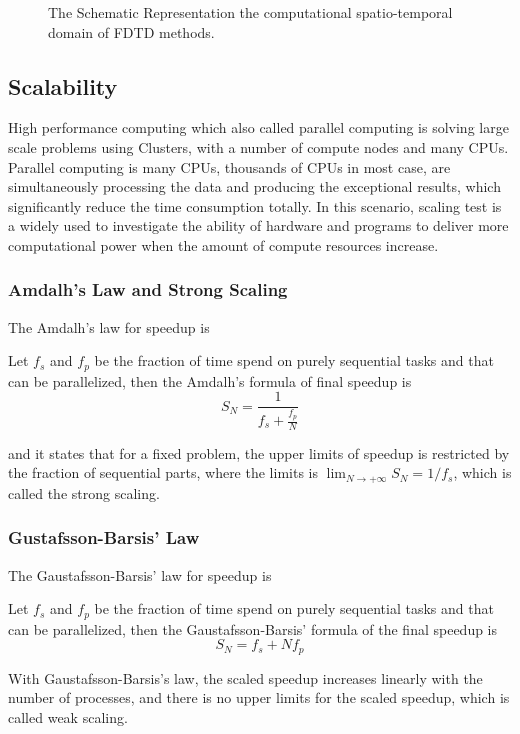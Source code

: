 \begin{figure}[htbp]
  \caption{The Schematic Representation the computational spatio-temporal domain of FDTD methods.}
  \label{FIG:Scheme_FDTD_2D_Heat}
\end{figure}



\subsection{Scalability}
High performance computing which also called 
parallel computing
is solving large scale problems using Clusters, with a number of compute nodes and many CPUs.
Parallel computing is many CPUs, thousands of CPUs in most case, are simultaneously processing the data and 
producing the exceptional results, which significantly reduce the time consumption totally.
In this scenario, scaling test is a widely used to investigate the ability of hardware and programs to 
deliver more computational power when the amount of compute resources increase.

\subsubsection{Amdalh's Law and Strong Scaling}
The Amdalh's law for speedup is 
\begin{theorem}\label{THEO:Amdalh's law}
  Let $f_s$ and $f_p$ be the fraction of time spend on purely sequential tasks and that can be parallelized, then 
  the Amdalh's formula
  \cite{Amdalh'sLaw} of final speedup is
  \begin{equation}\label{EQ:Amdalh's law}
    S_N = \frac{1}{f_s + \frac{f_p}{N}}
  \end{equation}
\end{theorem}
and it states that for a fixed problem, the upper limits of speedup is restricted by the fraction of sequential parts, 
where the limits is $\lim_{N\to +\infty} S_N = 1 / f_s$, which is called the strong scaling.


\subsubsection{Gustafsson-Barsis' Law}
The Gaustafsson-Barsis' law for speedup is 
\begin{theorem}\label{THEO:GaustafssonLaw}
  Let $f_s$ and $f_p$ be the fraction of time spend on purely sequential tasks and that can be parallelized, then 
  the Gaustafsson-Barsis' formula 
                                                        \cite{GaustafssonLaw}
  of the final speedup is 
  \begin{equation}\label{EQ:GaustafssonLaw}
    S_N = f_s + Nf_p
  \end{equation}
\end{theorem}
With Gaustafsson-Barsis's law, the scaled speedup increases linearly with the number of processes, and there is no upper 
limits for the scaled speedup, which is called weak scaling.
